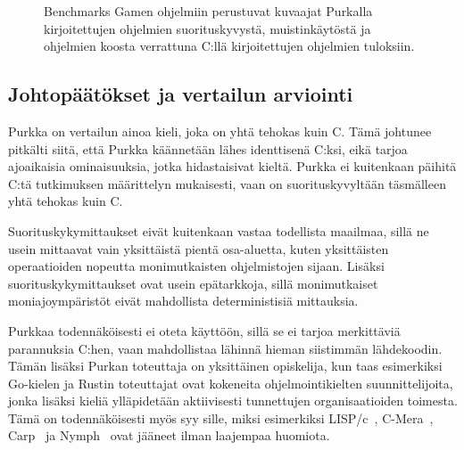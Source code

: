 \begin{figure}[ht!]
    \begin{adjustbox}{center}
        \begin{minipage}{1.25\textwidth}
        
        \end{minipage}
    \end{adjustbox}

    \begin{adjustbox}{center}
        \begin{minipage}{1.25\textwidth}
        
        \end{minipage}
    \end{adjustbox}

    \begin{adjustbox}{center}
        \begin{minipage}{1.25\textwidth}
        
        \end{minipage}
    \end{adjustbox}
    \caption{
        Benchmarks Gamen ohjelmiin perustuvat kuvaajat Purkalla kirjoitettujen ohjelmien
        suorituskyvystä, muistinkäytöstä ja ohjelmien koosta verrattuna C:llä
        kirjoitettujen ohjelmien tuloksiin.}
    \label{fig:purkkabenchmarksgame}
\end{figure}

\FloatBarrier

\subsection{Johtopäätökset ja vertailun arviointi}

Purkka on vertailun ainoa kieli, joka on yhtä tehokas kuin C. Tämä johtunee
pitkälti siitä, että Purkka käännetään lähes identtisenä C:ksi, eikä tarjoa
ajoaikaisia ominaisuuksia, jotka hidastaisivat kieltä. Purkka ei kuitenkaan
päihitä C:tä tutkimuksen määrittelyn mukaisesti, vaan on suorituskyvyltään
täsmälleen yhtä tehokas kuin C.

Suorituskykymittaukset eivät kuitenkaan vastaa todellista maailmaa, sillä ne
usein mittaavat vain yksittäistä pientä osa-aluetta, kuten yksittäisten
operaatioiden nopeutta monimutkaisten ohjelmistojen sijaan. Lisäksi
suorituskykymittaukset ovat usein epätarkkoja, sillä monimutkaiset
moniajoympäristöt eivät mahdollista deterministisiä mittauksia.

Purkkaa todennäköisesti ei oteta käyttöön, sillä se ei tarjoa merkittäviä
parannuksia C:hen, vaan mahdollistaa lähinnä hieman siistimmän lähdekoodin.
Tämän lisäksi Purkan toteuttaja on yksittäinen opiskelija, kun taas esimerkiksi
Go-kielen ja Rustin toteuttajat ovat kokeneita ohjelmointikielten
suunnittelijoita, jonka lisäksi kieliä ylläpidetään aktiivisesti tunnettujen
organisaatioiden toimesta. Tämä on todennäköisesti myös syy sille, miksi
esimerkiksi LISP/c~\citep{clisp1}, C-Mera~\citep{clisp2}, Carp~\citep{clisp3}
ja Nymph~\citep{nymph} ovat jääneet ilman laajempaa huomiota.

